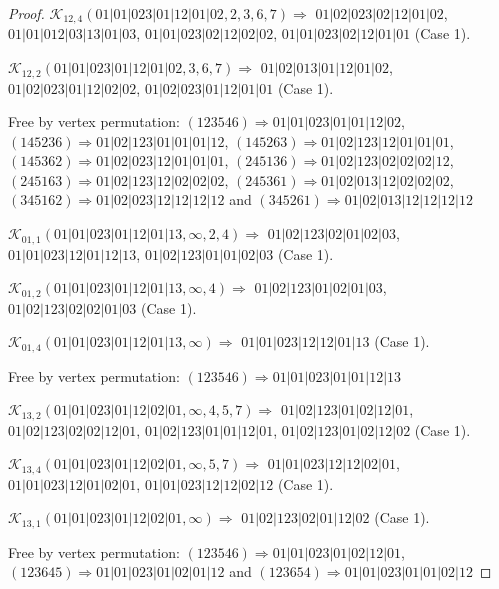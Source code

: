 \documentclass[12pt]{article}
\theoremstyle{plain}
\theoremstyle{definition}
\theoremstyle{remark}
\newcommand{\fancy}[1]{\mathcal{#1}}
\def\K{\fancy{K}}
\begin{document}
\begin{proof}
	\bigskip
	
	$\K_{12,4}(01|01|023|01|12|01|02,2, 3, 6, 7)\Rightarrow $ $01|02|023|02|12|01|02$, $01|01|012|03|13|01|03$, $01|01|023|02|12|02|02$, $01|01|023|02|12|01|01$ (Case 1).
	
	$\K_{12,2}(01|01|023|01|12|01|02,3, 6, 7)\Rightarrow $ $01|02|013|01|12|01|02$, $01|02|023|01|12|02|02$, $01|02|023|01|12|01|01$ (Case 1).
	
	
	
	Free by vertex permutation: $(1 2 3 5 4 6)\Rightarrow 01|01|023|01|01|12|02$, $(1 4 5 2 3 6)\Rightarrow 01|02|123|01|01|01|12$, $(1 4 5 2 6 3)\Rightarrow 01|02|123|12|01|01|01$, $(1 4 5 3 6 2)\Rightarrow 01|02|023|12|01|01|01$, $(2 4 5 1 3 6)\Rightarrow 01|02|123|02|02|02|12$, $(2 4 5 1 6 3)\Rightarrow 01|02|123|12|02|02|02$, $(2 4 5 3 6 1)\Rightarrow 01|02|013|12|02|02|02$, $(3 4 5 1 6 2)\Rightarrow 01|02|023|12|12|12|12$ and $(3 4 5 2 6 1)\Rightarrow 01|02|013|12|12|12|12$
	
	
	
	\bigskip
	
	$\K_{01,1}(01|01|023|01|12|01|13,\infty,2, 4)\Rightarrow $ $01|02|123|02|01|02|03$, $01|01|023|12|01|12|13$, $01|02|123|01|01|02|03$ (Case 1).
	
	$\K_{01,2}(01|01|023|01|12|01|13,\infty,4)\Rightarrow $ $01|02|123|01|02|01|03$, $01|02|123|02|02|01|03$ (Case 1).
	
	$\K_{01,4}(01|01|023|01|12|01|13,\infty)\Rightarrow $ $01|01|023|12|12|01|13$ (Case 1).
	
	
	
	Free by vertex permutation: $(1 2 3 5 4 6)\Rightarrow 01|01|023|01|01|12|13$
	
	
	
	\bigskip
	
	$\K_{13,2}(01|01|023|01|12|02|01,\infty,4, 5, 7)\Rightarrow $ $01|02|123|01|02|12|01$, $01|02|123|02|02|12|01$, $01|02|123|01|01|12|01$, $01|02|123|01|02|12|02$ (Case 1).
	
	$\K_{13,4}(01|01|023|01|12|02|01,\infty,5, 7)\Rightarrow $ $01|01|023|12|12|02|01$, $01|01|023|12|01|02|01$, $01|01|023|12|12|02|12$ (Case 1).
	
	$\K_{13,1}(01|01|023|01|12|02|01,\infty)\Rightarrow $ $01|02|123|02|01|12|02$ (Case 1).
	
	
	
	Free by vertex permutation: $(1 2 3 5 4 6)\Rightarrow 01|01|023|01|02|12|01$, $(1 2 3 6 4 5)\Rightarrow 01|01|023|01|02|01|12$ and $(1 2 3 6 5 4)\Rightarrow 01|01|023|01|01|02|12$
	

\end{proof}
\end{document}
